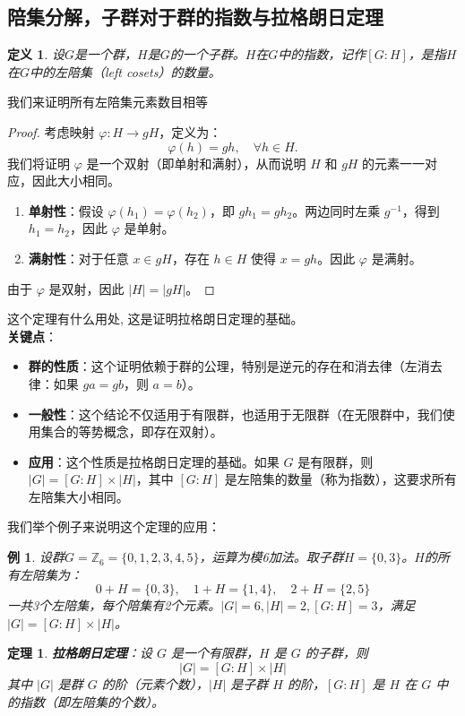 \documentclass{ctexart}%
\newtheorem{definition}{定义}
\newtheorem{example}{例}
\newtheorem{theorem}{定理}
\begin{document}
\subsection{陪集分解，子群对于群的指数与拉格朗日定理}
\begin{definition}
    设$G$是一个群，$H$是$G$的一个子群。$H$在$G$中的指数，记作$[G : H]$，是指$H$在$G$中的左陪集（left cosets）的数量。
\end{definition}
我们来证明所有左陪集元素数目相等
\begin{proof}
    考虑映射 $\varphi: H \to gH$，定义为：
    \[
        \varphi(h) = gh, \quad \forall h \in H.
    \]
    我们将证明 $\varphi$ 是一个双射（即单射和满射），从而说明 $H$ 和 $gH$ 的元素一一对应，因此大小相同。
    \begin{enumerate}
        \item \textbf{单射性}：假设 $\varphi(h_1) = \varphi(h_2)$，即 $gh_1 = gh_2$。两边同时左乘 $g^{-1}$，得到 $h_1 = h_2$，因此 $\varphi$ 是单射。
        \item \textbf{满射性}：对于任意 $x \in gH$，存在 $h \in H$ 使得 $x = gh$。因此 $\varphi$ 是满射。
    \end{enumerate}
    由于 $\varphi$ 是双射，因此 $|H| = |gH|$。
\end{proof}
这个定理有什么用处, 这是证明拉格朗日定理的基础。\\
\textbf{关键点}：
\begin{itemize}
    \item \textbf{群的性质}：这个证明依赖于群的公理，特别是逆元的存在和消去律（左消去律：如果 $ga = gb$，则 $a = b$）。
    \item \textbf{一般性}：这个结论不仅适用于有限群，也适用于无限群（在无限群中，我们使用集合的等势概念，即存在双射）。
    \item \textbf{应用}：这个性质是拉格朗日定理的基础。如果 $G$ 是有限群，则 $|G| = [G : H] \times |H|$，其中 $[G : H]$ 是左陪集的数量（称为指数），这要求所有左陪集大小相同。
\end{itemize}
我们举个例子来说明这个定理的应用：
\begin{example}
    设群$G = \mathbb{Z}_6 = \{0,1,2,3,4,5\}$，运算为模6加法。取子群$H = \{0,3\}$。$H$的所有左陪集为：
    \[
    0+H = \{0,3\},\quad 1+H = \{1,4\},\quad 2+H = \{2,5\}
    \]
    一共3个左陪集，每个陪集有2个元素。$|G| = 6, |H| = 2, [G:H] = 3$，满足$|G| = [G:H] \times |H|$。
\end{example}
\begin{theorem}
    \textbf{拉格朗日定理}：设 $G$ 是一个有限群，$H$ 是 $G$ 的子群，则
    \[
        |G| = [G : H] \times |H|
    \]
    其中 $|G|$ 是群 $G$ 的阶（元素个数），$|H|$ 是子群 $H$ 的阶，$[G : H]$ 是 $H$ 在 $G$ 中的指数（即左陪集的个数）。
\end{theorem}
\end{document}
